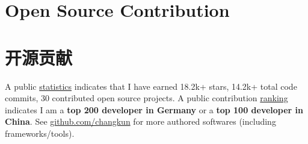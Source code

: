  {
  \section{\textbf{Open Source Contribution}}
}{
  \section{\textbf{开源贡献}}
}
\small A public \href{https://github-readme-stats.vercel.app/api?username=changkun&include_all_commits=true}{statistics} indicates that I have earned 18.2k+ stars, 14.2k+ total code commits, 30 contributed open source projects. A public contribution \href{https://github.com/gayanvoice/top-github-users/blob/858980e5cb10d1b4c27a24d36ae6547aa0f195cd/markdown/public_contributions/germany.md}{ranking} indicates I am a \textbf{top 200 developer in Germany} or a \textbf{top 100 developer in China}. See \href{https://github.com/changkun}{github.com/changkun} for more authored softwares (including frameworks/tools).
